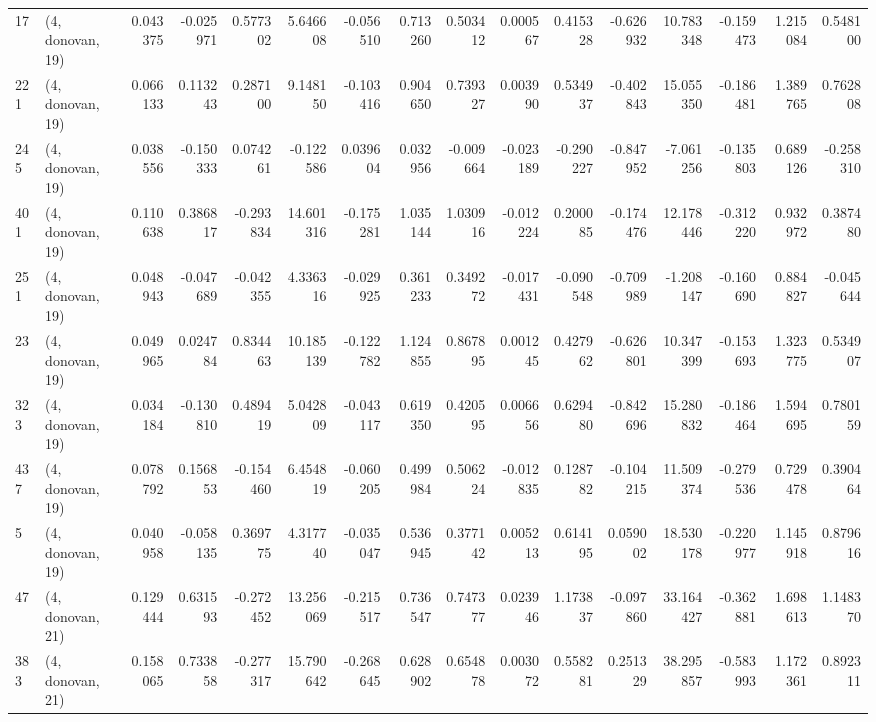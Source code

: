 \begin{tabular}{llrrrrrrrrrrrrrr}
17  &  (4, donovan, 19) &   0.043375 & -0.025971 &  0.577302 &     5.646608 &  -0.056510 &   0.713260 &   0.503412 &  0.000567 &  0.415328 & -0.626932 &   10.783348 & -0.159473 &  1.215084 &  0.548100 \\
221 &  (4, donovan, 19) &   0.066133 &  0.113243 &  0.287100 &     9.148150 &  -0.103416 &   0.904650 &   0.739327 &  0.003990 &  0.534937 & -0.402843 &   15.055350 & -0.186481 &  1.389765 &  0.762808 \\
245 &  (4, donovan, 19) &   0.038556 & -0.150333 &  0.074261 &    -0.122586 &   0.039604 &   0.032956 &  -0.009664 & -0.023189 & -0.290227 & -0.847952 &   -7.061256 & -0.135803 &  0.689126 & -0.258310 \\
401 &  (4, donovan, 19) &   0.110638 &  0.386817 & -0.293834 &    14.601316 &  -0.175281 &   1.035144 &   1.030916 & -0.012224 &  0.200085 & -0.174476 &   12.178446 & -0.312220 &  0.932972 &  0.387480 \\
251 &  (4, donovan, 19) &   0.048943 & -0.047689 & -0.042355 &     4.336316 &  -0.029925 &   0.361233 &   0.349272 & -0.017431 & -0.090548 & -0.709989 &   -1.208147 & -0.160690 &  0.884827 & -0.045644 \\
23  &  (4, donovan, 19) &   0.049965 &  0.024784 &  0.834463 &    10.185139 &  -0.122782 &   1.124855 &   0.867895 &  0.001245 &  0.427962 & -0.626801 &   10.347399 & -0.153693 &  1.323775 &  0.534907 \\
323 &  (4, donovan, 19) &   0.034184 & -0.130810 &  0.489419 &     5.042809 &  -0.043117 &   0.619350 &   0.420595 &  0.006656 &  0.629480 & -0.842696 &   15.280832 & -0.186464 &  1.594695 &  0.780159 \\
437 &  (4, donovan, 19) &   0.078792 &  0.156853 & -0.154460 &     6.454819 &  -0.060205 &   0.499984 &   0.506224 & -0.012835 &  0.128782 & -0.104215 &   11.509374 & -0.279536 &  0.729478 &  0.390464 \\
5   &  (4, donovan, 19) &   0.040958 & -0.058135 &  0.369775 &     4.317740 &  -0.035047 &   0.536945 &   0.377142 &  0.005213 &  0.614195 &  0.059002 &   18.530178 & -0.220977 &  1.145918 &  0.879616 \\
47  &  (4, donovan, 21) &   0.129444 &  0.631593 & -0.272452 &    13.256069 &  -0.215517 &   0.736547 &   0.747377 &  0.023946 &  1.173837 & -0.097860 &   33.164427 & -0.362881 &  1.698613 &  1.148370 \\
383 &  (4, donovan, 21) &   0.158065 &  0.733858 & -0.277317 &    15.790642 &  -0.268645 &   0.628902 &   0.654878 &  0.003072 &  0.558281 &  0.251329 &   38.295857 & -0.583993 &  1.172361 &  0.892311 \\

\end{tabular}
